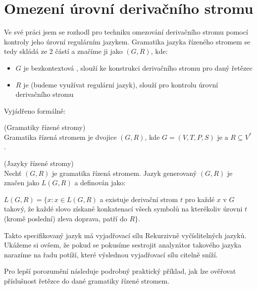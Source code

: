 \section{Omezení úrovní derivačního stromu}

Ve své práci jsem se rozhodl pro techniku omezování derivačního stromu pomocí
kontroly jeho úrovní regulárním jazykem.
Gramatika jazyka řízeného stromem se tedy skládá ze 2 částí a značíme ji jako
$(G, R)$, kde:
\begin{itemize}
  \item $G$ je bezkontextová , slouží ke konstrukci derivačního stromu
  pro daný řetězec
  \item $R$ je  (budeme využívat regulární jazyk),
  slouží pro kontrolu úrovní derivačního stromu
\end{itemize}

\noindent
Vyjádřeno formálně:

\begin{defn}
  (Gramatiky řízené stromy)\\
  Gramatika řízená stromem je dvojice $(G, R)$, kde $G = (V, T, P, S)$
  je  a $R \subseteq V^*$ .
\end{defn}

\begin{defn}
  \label{defn:treeControlledLanguages}
  (Jazyky řízené stromy)\\
  Nechť $(G, R)$ je gramatika řízená stromem.
  Jazyk generovaný $(G, R)$ je značen jako $L(G, R)$ a definován jako:
  \vspace{5pt}
  \begin{adjustwidth}{0.5cm}{0.5cm}
    $L(G, R) = \{x: x \in L(G, R)$ a existuje derivační strom $t$ pro
    každé $x$ v $G$ takový, že každé slovo získané konkatenací
    všech symbolů na kterékoliv úrovni $t$ (kromě poslední) zleva doprava,
    patří do $R \}$.
  \end{adjustwidth}
\end{defn}

\noindent
Takto specifikovaný jazyk má vyjadřovací sílu Rekurzivně vyčíslitelných jazyků.\cite{Koutny}
Ukážeme si ovšem, že pokud se pokusíme sestrojit analyzátor takového jazyka
narazíme na řadu potíží, které výslednou vyjadřovací sílu citelně sníží.

Pro lepší porozumění následuje podrobný praktický příklad, jak lze
ověřovat příslušnost řetězce do dané gramatiky řízené stromem.

